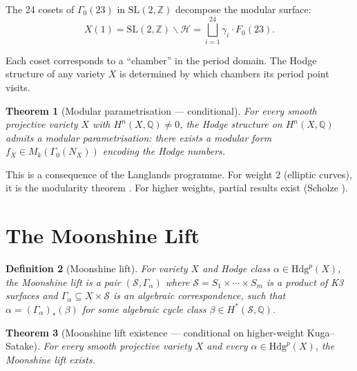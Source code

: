\documentclass[12pt,a4paper]{article}
\newtheorem{theorem}{Theorem}[section]
\newtheorem{definition}[theorem]{Definition}
\begin{document}
The 24 cosets of $\Gamma_0(23)$ in $\text{SL}(2,\mathbb{Z})$ decompose the modular surface:
\begin{equation}
X(1) = \text{SL}(2,\mathbb{Z})\backslash\mathcal{H} = \bigsqcup_{i=1}^{24} \gamma_i \cdot F_0(23).
\end{equation}

Each coset corresponds to a ``chamber'' in the period domain. The Hodge structure of any variety $X$ is determined by which chambers its period point visits.

\begin{theorem}[Modular parametrisation --- conditional]\label{thm:mod}
For every smooth projective variety $X$ with $H^n(X,\mathbb{Q}) \neq 0$, the Hodge structure on $H^n(X,\mathbb{Q})$ admits a modular parametrisation: there exists a modular form $f_X \in M_k(\Gamma_0(N_X))$ encoding the Hodge numbers.
\end{theorem}

This is a consequence of the Langlands programme. For weight 2 (elliptic curves), it is the modularity theorem \cite{Wiles1995}. For higher weights, partial results exist (Scholze \cite{Scholze2015}).

\section{The Moonshine Lift}

\begin{definition}[Moonshine lift]
For variety $X$ and Hodge class $\alpha \in \text{Hdg}^p(X)$, the Moonshine lift is a pair $(\mathcal{S}, \Gamma_\alpha)$ where $\mathcal{S} = S_1 \times \cdots \times S_m$ is a product of K3 surfaces and $\Gamma_\alpha \subseteq X \times \mathcal{S}$ is an algebraic correspondence, such that $\alpha = (\Gamma_\alpha)_*(\beta)$ for some algebraic cycle class $\beta \in H^*(\mathcal{S},\mathbb{Q})$.
\end{definition}

\begin{theorem}[Moonshine lift existence --- conditional on higher-weight Kuga--Satake]\label{thm:lift}
For every smooth projective variety $X$ and every $\alpha \in \text{Hdg}^p(X)$, the Moonshine lift exists.
\end{theorem}
\end{document}
